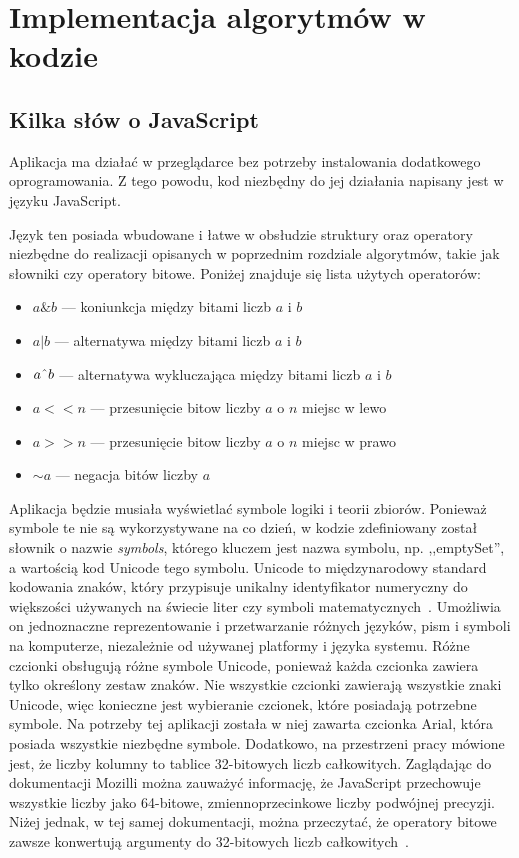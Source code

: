 \documentclass{SGGW-thesis}
\begin{document}
\chapter{Implementacja algorytmów w kodzie\label{sec:4}}

\section{Kilka słów o JavaScript}

\begin{paragraph}{}
    Aplikacja ma działać w przeglądarce bez potrzeby instalowania dodatkowego oprogramowania. Z tego powodu, kod niezbędny do jej działania napisany jest w języku JavaScript.

    Język ten posiada wbudowane i łatwe w obsłudzie struktury oraz operatory niezbędne do realizacji opisanych w poprzednim rozdziale algorytmów, takie jak słowniki czy operatory bitowe. Poniżej znajduje się lista użytych operatorów:
    \begin{itemize}
        \item $a \& b$ --- koniunkcja między bitami liczb $a$ i $b$
        \item $a | b$ --- alternatywa między bitami liczb $a$ i $b$
        \item $a \string^ b$ --- alternatywa wykluczająca między bitami liczb $a$ i $b$
        \item $a << n$ --- przesunięcie bitow liczby $a$ o $n$ miejsc w lewo
        \item $a >> n$ --- przesunięcie bitow liczby $a$ o $n$ miejsc w prawo
        \item $\sim a$ --- negacja bitów liczby $a$
    \end{itemize}
    
    Aplikacja będzie musiała wyświetlać symbole logiki i teorii zbiorów. Ponieważ symbole te nie są wykorzystywane na co dzień, w kodzie zdefiniowany został słownik o nazwie \emph{symbols}, którego kluczem jest nazwa symbolu, np. ,,emptySet'', a wartością kod Unicode tego symbolu. Unicode to międzynarodowy standard kodowania znaków, który przypisuje unikalny identyfikator numeryczny do większości używanych na świecie liter czy symboli matematycznych~\cite{wiki:Unicode}. Umożliwia on jednoznaczne reprezentowanie i przetwarzanie różnych języków, pism i symboli na komputerze, niezależnie od używanej platformy i języka systemu. 
    Różne czcionki obsługują różne symbole Unicode, ponieważ każda czcionka zawiera tylko określony zestaw znaków. Nie wszystkie czcionki zawierają wszystkie znaki Unicode, więc konieczne jest wybieranie czcionek, które posiadają potrzebne symbole. Na potrzeby tej aplikacji została w niej zawarta czcionka Arial, która posiada wszystkie niezbędne symbole.
    Dodatkowo, na przestrzeni pracy mówione jest, że liczby kolumny to tablice 32-bitowych liczb całkowitych. Zaglądając do dokumentacji Mozilli można zauważyć informację, że JavaScript przechowuje wszystkie liczby jako 64-bitowe, zmiennoprzecinkowe liczby podwójnej precyzji. Niżej jednak, w tej samej dokumentacji, można przeczytać, że operatory bitowe zawsze konwertują argumenty do 32-bitowych liczb całkowitych~\cite{docs:mozilla:numbers}.
\end{paragraph}
\newpage
\end{document}
